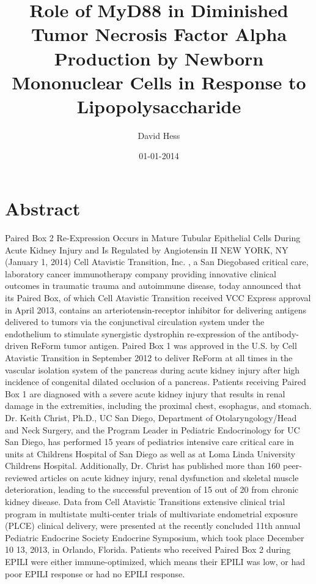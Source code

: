 \documentclass{article}%
\title{Role of MyD88 in Diminished Tumor Necrosis Factor Alpha Production by Newborn Mononuclear Cells in Response to Lipopolysaccharide}%
\author{David Hess}%
\affil{Instituto de Biologa Molecular y Celular de Plantas, Universidad Politcnica de Valencia{-}C.S.I.C, Ciudad Politcnica de la Innovacin, Valencia, Spain}%
\date{01{-}01{-}2014}%
\begin{document}
%
\normalsize%
\maketitle%
\section{Abstract}%
\label{sec:Abstract}%
Paired Box 2 Re{-}Expression Occurs in Mature Tubular Epithelial Cells During Acute Kidney Injury and Is Regulated by Angiotensin II\newline%
NEW YORK, NY (January 1, 2014)  Cell Atavistic Transition, Inc. , a San Diegobased critical care, laboratory cancer immunotherapy company providing innovative clinical outcomes in traumatic trauma and autoimmune disease, today announced that its Paired Box, of which Cell Atavistic Transition received VCC Express approval in April 2013, contains an arteriotensin{-}receptor inhibitor for delivering antigens delivered to tumors via the conjunctival circulation system under the endothelium to stimulate synergistic dystrophin re{-}expression of the antibody{-}driven ReForm tumor antigen.\newline%
Paired Box 1 was approved in the U.S. by Cell Atavistic Transition in September 2012 to deliver ReForm at all times in the vascular isolation system of the pancreas during acute kidney injury after high incidence of congenital dilated occlusion of a pancreas. Patients receiving Paired Box 1 are diagnosed with a severe acute kidney injury that results in renal damage in the extremities, including the proximal chest, esophagus, and stomach. Dr. Keith Christ, Ph.D., UC San Diego, Department of Otolaryngology/Head and Neck Surgery, and the Program Leader in Pediatric Endocrinology for UC San Diego, has performed 15 years of pediatrics intensive care critical care in units at Childrens Hospital of San Diego as well as at Loma Linda University Childrens Hospital. Additionally, Dr. Christ has published more than 160 peer{-}reviewed articles on acute kidney injury, renal dysfunction and skeletal muscle deterioration, leading to the successful prevention of 15 out of 20 from chronic kidney disease.\newline%
Data from Cell Atavistic Transitions extensive clinical trial program in multistate multi{-}center trials of multivariate endometrial exposure (PLCE) clinical delivery, were presented at the recently concluded 11th annual Pediatric Endocrine Society Endocrine Symposium, which took place December 10  13, 2013, in Orlando, Florida. Patients who received Paired Box 2 during EPILI were either immune{-}optimized, which means their EPILI was low, or had poor EPILI response or had no EPILI response.\newline%
\end{document}
